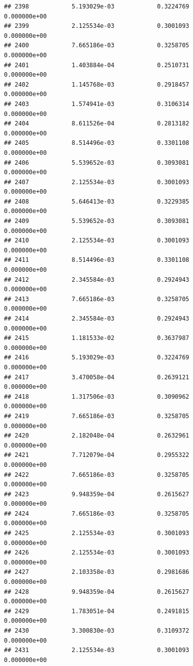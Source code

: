 \documentclass[
]{article}
\begin{document}
\begin{verbatim}
## 2398            5.193029e-03            0.3224769            0.000000e+00
## 2399            2.125534e-03            0.3001093            0.000000e+00
## 2400            7.665186e-03            0.3258705            0.000000e+00
## 2401            1.403884e-04            0.2510731            0.000000e+00
## 2402            1.145768e-03            0.2918457            0.000000e+00
## 2403            1.574941e-03            0.3106314            0.000000e+00
## 2404            8.611526e-04            0.2813182            0.000000e+00
## 2405            8.514496e-03            0.3301108            0.000000e+00
## 2406            5.539652e-03            0.3093081            0.000000e+00
## 2407            2.125534e-03            0.3001093            0.000000e+00
## 2408            5.646413e-03            0.3229385            0.000000e+00
## 2409            5.539652e-03            0.3093081            0.000000e+00
## 2410            2.125534e-03            0.3001093            0.000000e+00
## 2411            8.514496e-03            0.3301108            0.000000e+00
## 2412            2.345584e-03            0.2924943            0.000000e+00
## 2413            7.665186e-03            0.3258705            0.000000e+00
## 2414            2.345584e-03            0.2924943            0.000000e+00
## 2415            1.181533e-02            0.3637987            0.000000e+00
## 2416            5.193029e-03            0.3224769            0.000000e+00
## 2417            3.470058e-04            0.2639121            0.000000e+00
## 2418            1.317506e-03            0.3090962            0.000000e+00
## 2419            7.665186e-03            0.3258705            0.000000e+00
## 2420            2.182048e-04            0.2632961            0.000000e+00
## 2421            7.712079e-04            0.2955322            0.000000e+00
## 2422            7.665186e-03            0.3258705            0.000000e+00
## 2423            9.948359e-04            0.2615627            0.000000e+00
## 2424            7.665186e-03            0.3258705            0.000000e+00
## 2425            2.125534e-03            0.3001093            0.000000e+00
## 2426            2.125534e-03            0.3001093            0.000000e+00
## 2427            2.103358e-03            0.2981686            0.000000e+00
## 2428            9.948359e-04            0.2615627            0.000000e+00
## 2429            1.783051e-04            0.2491815            0.000000e+00
## 2430            3.300830e-03            0.3109372            0.000000e+00
## 2431            2.125534e-03            0.3001093            0.000000e+00

\end{verbatim}
\end{document}
